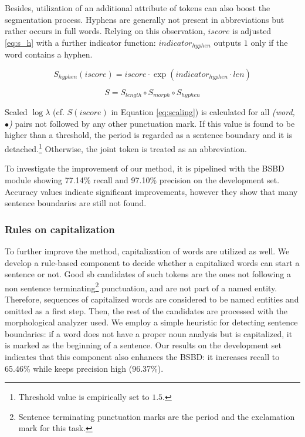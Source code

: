 Besides, utilization of an additional attribute of tokens can also boost the segmentation process.
Hyphens are generally not present in abbreviations but rather occurs in full words. 
Relying on this observation, $iscore$ is adjusted \eqref{eq:s_h} with a further indicator function:
$indicator_{hyphen}$ outputs $1$ only if the word contains a hyphen. 

\begin{equation} \label{eq:s_h}
S_{hyphen}(iscore)= iscore \cdot \exp{(indicator_{hyphen} \cdot len)}
\end{equation}

\begin{equation} \label{eq:scaling}
S = S_{length} \circ S_{morph} \circ S_{hyphen}
\end{equation}

Scaled $\log \lambda$ (cf. $S(iscore)$ in Equation \ref{eq:scaling}) is calculated for all \emph{(word, $\bullet$)} pairs not followed by any other punctuation mark. 
If this value is found to be higher than a threshold, the period is regarded as a sentence boundary and it is detached.\footnote{Threshold value is empirically set to $1.5$.} 
Otherwise, the joint token is treated as an abbreviation.

To investigate the improvement of our method, it is pipelined with the BSBD module showing 77.14\% recall and 97.10\% precision on the development set. 
Accuracy values indicate significant improvements, however they show that many sentence boundaries are still not found.

\subsubsection{Rules on capitalization}

To further improve the method, capitalization of words are utilized as well. 
We develop a rule-based component to decide whether a capitalized words can start a sentence or not.
Good \acrshort{sb} candidates of such tokens are the ones not following a non sentence terminating\footnote{Sentence terminating punctuation marks are the period and the exclamation mark for this task.} punctuation, and are not part of a named entity. 
Therefore, sequences of capitalized words are considered to be named entities and omitted as a first step. 
Then, the rest of the candidates are processed with the morphological analyzer used.
We employ a simple heuristic for detecting sentence boundaries:
if a word does not have a proper noun analysis but is capitalized, it is marked as the beginning of a sentence.  
Our results on the development set indicates that this component also enhances the BSBD: it increases recall to 65.46\% while keeps precision high (96.37\%). 

